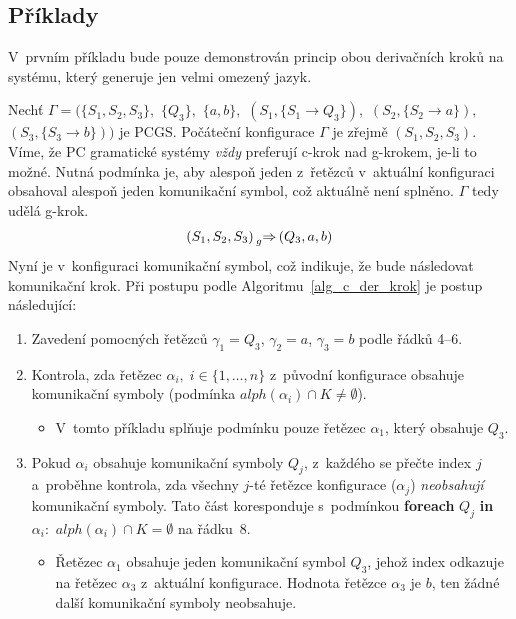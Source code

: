 \subsection*{Příklady}
V~prvním příkladu bude pouze demonstrován princip obou derivačních kroků na systému, který generuje jen velmi omezený jazyk.
\begin{example}
    Nechť $\Gamma = (\{S_1, S_2, S_3\},$ $\{Q_3\},$ $\{a, b\},$ $(S_1, \{S_1 \rightarrow Q_3\}),$ $(S_2, \{S_2 \rightarrow a\}),$ $(S_3, \{S_3 \rightarrow b\}))$ je PCGS.
    Počáteční konfigurace $\Gamma$ je zřejmě $(S_1, S_2, S_3)$.
    Víme, že PC gramatické systémy \emph{vždy} preferují c-krok nad g-krokem, je-li to možné.
    Nutná podmínka je, aby alespoň jeden z~řetězců v~aktuální konfiguraci obsahoval alespoň jeden komunikační symbol, což aktuálně není splněno.
    $\Gamma$ tedy udělá g-krok.
     \begin{equation*}
    (S_1, S_2, S_3) \prescript{}{g}{\Rightarrow}\, (Q_3, a, b)
     \end{equation*}
     Nyní je v~konfiguraci komunikační symbol, což indikuje, že bude následovat komunikační krok.
     Při postupu podle Algoritmu~\ref{alg_c_der_krok} je postup následující:
     \begin{enumerate}
        \item Zavedení pomocných řetězců $\gamma_1 = Q_3$, $\gamma_2 = a$, $\gamma_3 = b$ podle řádků 4--6.
        \item Kontrola, zda řetězec $\alpha_i,\; i \in \{1, \ldots, n\}$ z~původní konfigurace obsahuje komunikační symboly (podmínka $alph(\alpha_i) \cap K \neq \emptyset$).
        \begin{itemize}[label=$\circ$]
            \item V~tomto příkladu splňuje podmínku pouze řetězec $\alpha_1$, který obsahuje $Q_3$.
        \end{itemize}
        \item Pokud $\alpha_i$ obsahuje komunikační symboly $Q_j$, z~každého se přečte index $j$ a~proběhne kontrola, zda všechny $j$-té řetězce konfigurace ($\alpha_j$) \emph{neobsahují} komunikační symboly.
        Tato část koresponduje s~podmínkou \textbf{foreach} $Q_j$ \textbf{in} $\alpha_i\!:$ $alph(\alpha_i) \cap K = \emptyset$ na řádku~8.
        \begin{itemize}[label=$\circ$]
            \item Řetězec $\alpha_1$ obsahuje jeden komunikační symbol $Q_3$, jehož index odkazuje na řetězec $\alpha_3$ z~aktuální konfigurace.
            Hodnota řetězce $\alpha_3$ je $b$, ten žádné další komunikační symboly neobsahuje.

\end{itemize}
\end{enumerate}
\end{example}
